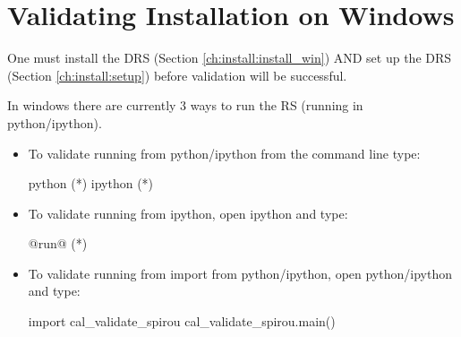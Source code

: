 \clearpage
\newpage
\section{Validating Installation on Windows}
\label{ch:install:validating_installwin}

\begin{note}
One must install the DRS (Section \ref{ch:install:install_win}) AND set up the DRS (Section \ref{ch:install:setup}) before validation will be successful.
\end{note}

\noindent In windows there are currently 3 ways to run the RS (running in python/ipython).

\begin{itemize}
\item To validate running from python/ipython from the command line type:
\begin{cmdbox}
python (*\calvalidate*)
ipython (*\calvalidate*)
\end{cmdbox}

\item To validate running from ipython, open ipython and type:
\begin{pythonbox}
@run@ (*\calvalidate*)
\end{pythonbox}

\item To validate running from import from python/ipython, open python/ipython and type:
\begin{pythonbox}
import cal_validate_spirou
cal_validate_spirou.main()
\end{pythonbox}

\end{itemize}

